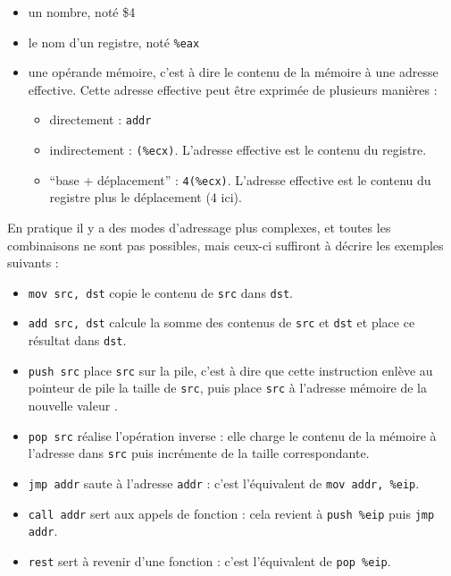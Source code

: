 \begin{itemize}
\item
  un nombre, noté \$4
\item
  le nom d'un registre, noté \texttt{\%eax}
\item
  une opérande mémoire, c'est à dire le contenu de la mémoire à une
  adresse effective. Cette adresse effective peut être exprimée de
  plusieurs manières :
  \begin{itemize}
  \item
    directement : \texttt{addr}
  \item
    indirectement : \texttt{(\%ecx)}. L'adresse effective est le contenu
    du registre.
  \item
    ``base + déplacement'' : \texttt{4(\%ecx)}. L'adresse effective est
    le contenu du registre plus le déplacement (4 ici).
  \end{itemize}
\end{itemize}

En pratique il y a des modes d'adressage plus complexes, et toutes les
combinaisons ne sont pas possibles, mais ceux-ci suffiront à décrire les
exemples suivants :

\begin{itemize}

\item \texttt{mov src, dst} copie le contenu de \texttt{src} dans \texttt{dst}.

\item \texttt{add src, dst} calcule la somme des contenus de \texttt{src} et
  \texttt{dst} et place ce résultat dans \texttt{dst}.

\item \texttt{push src} place \texttt{src} sur la pile, c'est à dire que cette
  instruction enlève au pointeur de pile \esp la taille de \texttt{src}, puis
  place \texttt{src} à l'adresse mémoire de la nouvelle valeur \esp.

\item \texttt{pop src} réalise l'opération inverse : elle charge le contenu de
  la mémoire à l'adresse \esp dans \texttt{src} puis incrémente \esp de la
  taille correspondante.

\item \texttt{jmp addr} saute à l'adresse \texttt{addr} : c'est l'équivalent de
  \texttt{mov addr, \%eip}.

\item \texttt{call addr} sert aux appels de fonction : cela revient à
  \texttt{push \%eip} puis \texttt{jmp addr}.

\item \texttt{rest} sert à revenir d'une fonction : c'est l'équivalent de
  \texttt{pop \%eip}.

\end{itemize}

